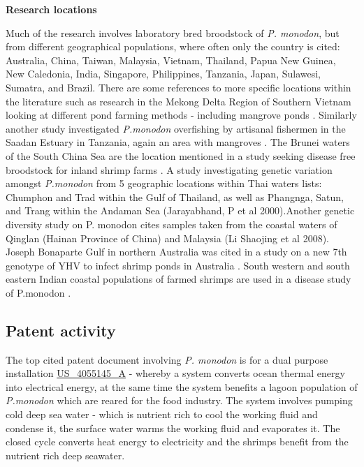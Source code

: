 \documentclass[]{book}
\theoremstyle{definition}
\theoremstyle{definition}
\theoremstyle{definition}
\theoremstyle{remark}
\begin{document}
\textbf{Research locations}

Much of the research involves laboratory bred broodstock of \emph{P.
monodon}, but from different geographical populations, where often only
the country is cited: Australia, China, Taiwan, Malaysia, Vietnam,
Thailand, Papua New Guinea, New Caledonia, India, Singapore,
Philippines, Tanzania, Japan, Sulawesi, Sumatra, and Brazil. There are
some references to more specific locations within the literature such as
research in the Mekong Delta Region of Southern Vietnam looking at
different pond farming methods - including mangrove ponds
\citep{Ha_2013}. Similarly another study investigated \emph{P.monodon}
overfishing by artisanal fishermen in the Saadan Estuary in Tanzania,
again an area with mangroves \citep{Mosha_2013}. The Brunei waters of
the South China Sea are the location mentioned in a study seeking
disease free broodstock for inland shrimp farms \citep{Claydon_2010}. A
study investigating genetic variation amongst \emph{P.monodon} from 5
geographic locations within Thai waters lists: Chumphon and Trad within
the Gulf of Thailand, as well as Phangnga, Satun, and Trang within the
Andaman Sea (Jarayabhand, P et al 2000).Another genetic diversity study
on P. monodon cites samples taken from the coastal waters of Qinglan
(Hainan Province of China) and Malaysia (Li Shaojing et al 2008). Joseph
Bonaparte Gulf in northern Australia was cited in a study on a new 7th
genotype of YHV to infect shrimp ponds in Australia \citep{Mohr_2015}.
South western and south eastern Indian coastal populations of farmed
shrimps are used in a disease study of P.monodon \citep{Mohr_2015}.

\hypertarget{patent-activity-6}{%
\subsection{Patent activity}\label{patent-activity-6}}

The top cited patent document involving \emph{P. monodon} is for a dual
purpose installation
\href{https://www.lens.org/lens/patent/US_4055145_A}{US\_4055145\_A} -
whereby a system converts ocean thermal energy into electrical energy,
at the same time the system benefits a lagoon population of
\emph{P.monodon} which are reared for the food industry. The system
involves pumping cold deep sea water - which is nutrient rich to cool
the working fluid and condense it, the surface water warms the working
fluid and evaporates it. The closed cycle converts heat energy to
electricity and the shrimps benefit from the nutrient rich deep
seawater.
\end{document}
